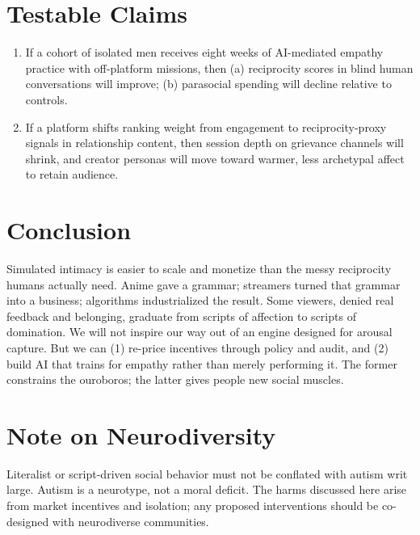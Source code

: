 \documentclass[12pt]{article}
\begin{document}
\section{Testable Claims}

\begin{enumerate}[label=\textbf{H\arabic*}.]
  \item If a cohort of isolated men receives eight weeks of AI-mediated empathy practice with off-platform missions, then (a) reciprocity scores in blind human conversations will improve; (b) parasocial spending will decline relative to controls.
  \item If a platform shifts ranking weight from engagement to reciprocity-proxy signals in relationship content, then session depth on grievance channels will shrink, and creator personas will move toward warmer, less archetypal affect to retain audience.
\end{enumerate}

\section{Conclusion}

Simulated intimacy is easier to scale and monetize than the messy reciprocity humans actually need. Anime gave a grammar; streamers turned that grammar into a business; algorithms industrialized the result. Some viewers, denied real feedback and belonging, graduate from scripts of affection to scripts of domination. We will not inspire our way out of an engine designed for arousal capture. But we can (1) re-price incentives through policy and audit, and (2) build AI that trains for empathy rather than merely performing it. The former constrains the ouroboros; the latter gives people new social muscles.

\section*{Note on Neurodiversity}

Literalist or script-driven social behavior must not be conflated with autism writ large. Autism is a neurotype, not a moral deficit. The harms discussed here arise from market incentives and isolation; any proposed interventions should be co-designed with neurodiverse communities.
\end{document}
